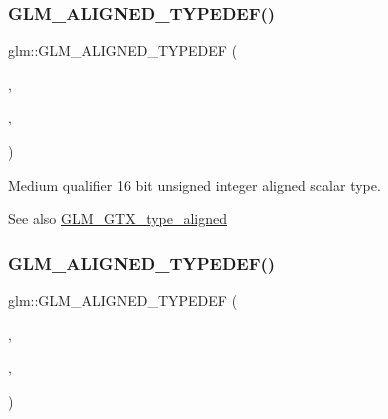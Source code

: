 \subsubsection{\texorpdfstring{G\+L\+M\+\_\+\+A\+L\+I\+G\+N\+E\+D\+\_\+\+T\+Y\+P\+E\+D\+E\+F()}{GLM\_ALIGNED\_TYPEDEF()}\hspace{0.1cm}{\footnotesize\ttfamily [82/209]}}
{\footnotesize\ttfamily glm\+::\+G\+L\+M\+\_\+\+A\+L\+I\+G\+N\+E\+D\+\_\+\+T\+Y\+P\+E\+D\+EF (\begin{DoxyParamCaption}\item[{\hyperlink{group__gtc__type__precision_ga2cef3a0d7b0fce75c9885f64656d8933}{mediump\+\_\+uint16}}]{,  }\item[{aligned\+\_\+mediump\+\_\+uint16}]{,  }\item[{2}]{ }\end{DoxyParamCaption})}

Medium qualifier 16 bit unsigned integer aligned scalar type. \begin{DoxySeeAlso}{See also}
\hyperlink{group__gtx__type__aligned}{G\+L\+M\+\_\+\+G\+T\+X\+\_\+type\+\_\+aligned} 
\end{DoxySeeAlso}
\mbox{\label{group__gtx__type__aligned_ga12566ca66d5962dadb4a5eb4c74e891e}} 
\subsubsection{\texorpdfstring{G\+L\+M\+\_\+\+A\+L\+I\+G\+N\+E\+D\+\_\+\+T\+Y\+P\+E\+D\+E\+F()}{GLM\_ALIGNED\_TYPEDEF()}\hspace{0.1cm}{\footnotesize\ttfamily [83/209]}}
{\footnotesize\ttfamily glm\+::\+G\+L\+M\+\_\+\+A\+L\+I\+G\+N\+E\+D\+\_\+\+T\+Y\+P\+E\+D\+EF (\begin{DoxyParamCaption}\item[{\hyperlink{group__gtc__type__precision_ga861dbd1051f488e425b3966001b568e5}{mediump\+\_\+uint32}}]{,  }\item[{aligned\+\_\+mediump\+\_\+uint32}]{,  }\item[{4}]{ }\end{DoxyParamCaption})}

